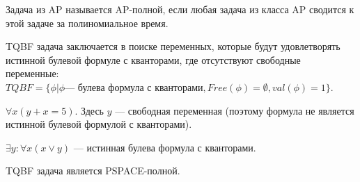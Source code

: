     \begin{Def}
        Задача из AP называется AP-полной, если любая задача из класса AP сводится к этой задаче за полиномиальное время.
    \end{Def}
    \begin{Def}
        TQBF задача заключается в поиске переменных, которые будут удовлетворять истинной булевой формуле с кванторами, где отсутствуют свободные переменные: $TQBF = \{\phi | \phi  \text{--- булева формула с кванторами}, Free(\phi) = \emptyset, val(\phi) = 1\}$.
    \end{Def}
    \begin{Example}
        $\forall x (y + x = 5)$. Здесь $y$ --- свободная переменная (поэтому формула не является истинной булевой формулой с кванторами).
    \end{Example}
    \begin{Example}
        $\exists y : \forall x (x \vee y)$ --- истинная булева формула с кванторами.
    \end{Example}
    \begin{Thm}
        TQBF задача является PSPACE-полной.
    \end{Thm}
